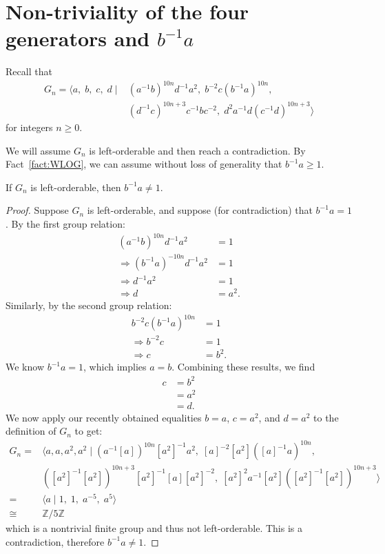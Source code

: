 

\section{Non-triviality of the four generators and $b^{-1}a$}
\label{section:identityProofs}

\noindent{}Recall that
\begin{align*}
G_n=\langle a,\; b,\; c,\; d \mid{} &(a^{-1}b)^{10n}d^{-1}a^{2},\; b^{-2}c(b^{-1}a)^{10n},\\
&(d^{-1}c)^{10n+3}c^{-1}bc^{-2},\; d^{2}a^{-1}d(c^{-1}d)^{10n+3} \rangle
\end{align*}
for integers $n\geq{}0$.

\vspace{10pt}

\noindent{}We will assume $G_n$ is left-orderable and then reach a contradiction. By Fact~\ref{fact:WLOG}, we can assume without loss of generality that $b^{-1}a\geq1$.

\begin{proposition}
If $G_n$ is left-orderable, then $b^{-1}a\neq1$.
\label{proposition:id:Ba}
\end{proposition}
\begin{proof}
Suppose $G_n$ is left-orderable, and suppose (for contradiction) that $b^{-1}a=1$. By the first group relation:
\begin{align}
(a^{-1}b)^{10n}d^{-1}a^{2} & =1\nonumber\\
\Rightarrow{}(b^{-1}a)^{-10n}d^{-1}a^{2} & =1\nonumber\\
\Rightarrow{} d^{-1}a^{2} & =1\nonumber\\
\Rightarrow{} d & =a^{2}.\nonumber
\end{align}
Similarly, by the second group relation:
\begin{align}
b^{-2}c(b^{-1}a)^{10n} & =1\nonumber\\
\Rightarrow b^{-2}c & =1\nonumber\\
\Rightarrow c & =b^{2}.\nonumber
\end{align}
We know $b^{-1}a=1$, which implies $a=b$. Combining these results, we find
\begin{align}
c & =b^{2}\nonumber\\
 & =a^{2}\nonumber\\
 & =d.\nonumber
\end{align}
We now apply our recently obtained equalities $b=a$, $c=a^{2}$, and $d=a^{2}$ to the definition of $G_{n}$ to get:
\begin{align}
G_{n}= & \langle a,a,a^{2},a^{2}\mid{}(a^{-1}[a])^{10n}[a^{2}]^{-1}a^{2},\;[a]^{-2}[a^{2}]([a]^{-1}a)^{10n},\nonumber\\
 & ([a^{2}]^{-1}[a^{2}])^{10n+3}[a^{2}]^{-1}[a][a^{2}]^{-2},\;[a^{2}]^{2}a^{-1}[a^{2}]([a^{2}]^{-1}[a^{2}])^{10n+3}\rangle\nonumber\\
= & \langle a\mid{}1,\;1,\; a^{-5},\; a^{5}\rangle\nonumber\\
\cong & \mathbb{Z}/5\mathbb{Z}\nonumber
\end{align}
which is a nontrivial finite group and thus not left-orderable. This is a contradiction, therefore $b^{-1}a\neq{}1$.
\end{proof}

